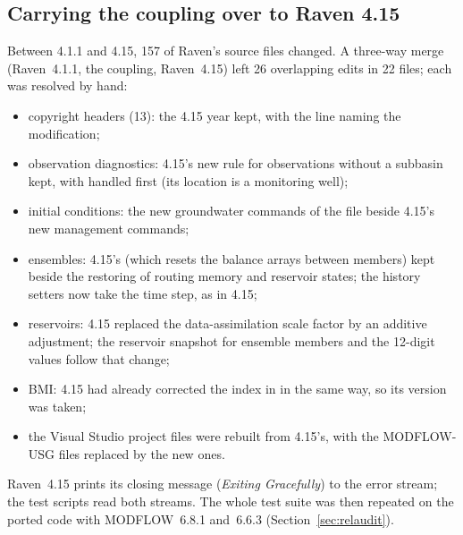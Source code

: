 \subsection{Carrying the coupling over to Raven 4.15}\label{sec:port}
Between 4.1.1 and 4.15, 157 of Raven's source files changed. A three-way merge (Raven~4.1.1, the coupling, Raven~4.15) left 26
overlapping edits in 22 files; each was resolved by hand:
\begin{itemize}
\item copyright headers (13): the 4.15 year kept, with the line naming the modification;
\item observation diagnostics: 4.15's new rule for observations without a subbasin kept, with  handled
      first (its location is a monitoring well);
\item initial conditions: the new groundwater commands of the  file beside 4.15's new management commands;
\item ensembles: 4.15's  (which resets the balance arrays between members) kept beside the
      restoring of routing memory and reservoir states; the history setters now take the time step, as in 4.15;
\item reservoirs: 4.15 replaced the data-assimilation scale factor by an additive adjustment; the reservoir snapshot for
      ensemble members and the 12-digit  values follow that change;
\item BMI: 4.15 had already corrected the index in  in the same way, so its version was taken;
\item the Visual Studio project files were rebuilt from 4.15's, with the MODFLOW-USG files replaced by the new ones.
\end{itemize}
Raven~4.15 prints its closing message (\emph{Exiting Gracefully}) to the error stream; the test scripts read both streams.
The whole test suite was then repeated on the ported code with MODFLOW~6.8.1 and~6.6.3 (Section~\ref{sec:relaudit}).

